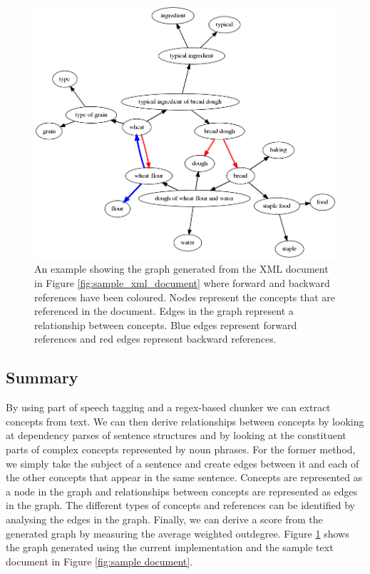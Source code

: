 \documentclass[12pt]{article}
\theoremstyle{grammarstyle}
\begin{document}
\begin{figure}
    \centering
    \includegraphics[width=\linewidth]{reports/technical_report/latex/figures/bread_graph-sections_only.png}
    \caption{An example showing the graph generated from the XML document in Figure \ref{fig:sample_xml_document} where forward and backward references have been coloured. Nodes represent the concepts that are referenced in the document. Edges in the graph represent a relationship between concepts. Blue edges represent forward references and red edges represent backward references.}
    \label{fig:graph_example-coloured_edges}
\end{figure}

\subsection{Summary}
By using part of speech tagging and a regex-based chunker we can extract concepts from text. We can then derive relationships between concepts by looking at dependency parses of sentence structures and by looking at the constituent parts of complex concepts represented by noun phrases. For the former method, we simply take the subject of a sentence and create edges between it and each of the other concepts that appear in the same sentence. Concepts are represented as a node in the graph and relationships between concepts are represented as edges in the graph.
The different types of concepts and references can be identified by analysing the edges in the graph. Finally, we can derive a score from the generated graph by measuring the average weighted outdegree. Figure \ref{fig:graph_example-coloured_edges} shows the graph generated using the current implementation and the sample text document in Figure \ref{fig:sample document}.
\end{document}
